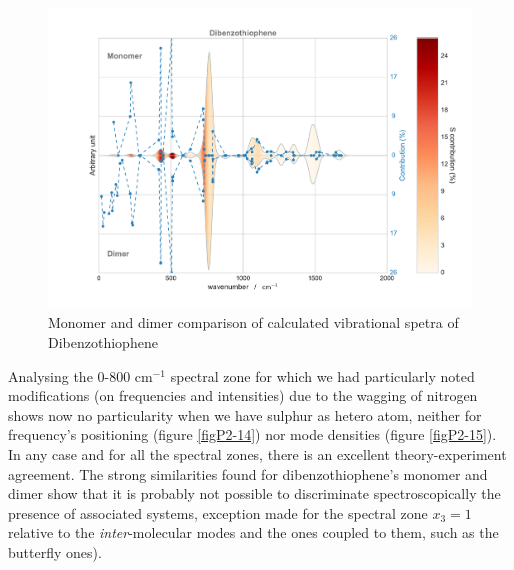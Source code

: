	
	\begin{figure}[H]
		\begin{center}
			\includegraphics[scale=0.4]{image/P2-13}
		\end{center}
		\caption{Monomer and dimer comparison of calculated vibrational spetra of Dibenzothiophene} \label{figP2-13}
	\end{figure}
	
		Analysing the 0-800 cm$^{-1}$ spectral zone for which we had particularly noted modifications (on frequencies and intensities) due to the wagging of nitrogen shows now no particularity when we have sulphur as hetero atom, neither for frequency’s positioning (figure \ref{figP2-14}) nor mode densities (figure \ref{figP2-15}). In any case and for all the spectral zones, there is an excellent theory-experiment agreement. The strong similarities found for dibenzothiophene’s monomer and dimer show that it is probably not possible to discriminate spectroscopically the presence of associated systems, exception made for the spectral zone $x_3=1$ relative to the \textit{inter}-molecular modes and the ones coupled to them, such as the butterfly ones).
	
